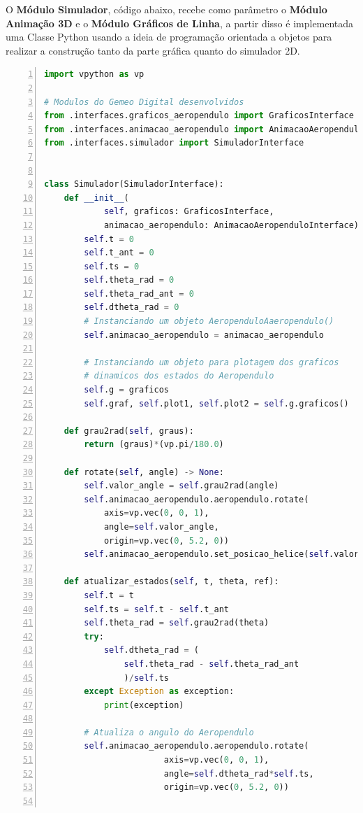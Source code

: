 \newpage

O \textbf{Módulo Simulador}, código abaixo, recebe como parâmetro  o \textbf{Módulo Animação 3D} e o \textbf{Módulo Gráficos de Linha}, a partir disso  é implementada uma Classe Python usando a ideia de programação orientada a objetos para realizar a construção tanto da parte gráfica quanto do simulador 2D.

\vspace{0.5cm}

\begin{lstlisting}[language=python, numbers=left, label=python-example, captionpos=b, caption={Classe que implementa o Gêmeo Digital}]
import vpython as vp

# Modulos do Gemeo Digital desenvolvidos
from .interfaces.graficos_aeropendulo import GraficosInterface
from .interfaces.animacao_aeropendulo import AnimacaoAeropenduloInterface
from .interfaces.simulador import SimuladorInterface


class Simulador(SimuladorInterface):
    def __init__(
            self, graficos: GraficosInterface,
            animacao_aeropendulo: AnimacaoAeropenduloInterface) -> None:
        self.t = 0
        self.t_ant = 0
        self.ts = 0
        self.theta_rad = 0
        self.theta_rad_ant = 0
        self.dtheta_rad = 0
        # Instanciando um objeto AeropenduloAaeropendulo()
        self.animacao_aeropendulo = animacao_aeropendulo

        # Instanciando um objeto para plotagem dos graficos
        # dinamicos dos estados do Aeropendulo
        self.g = graficos
        self.graf, self.plot1, self.plot2 = self.g.graficos()  # noqa

    def grau2rad(self, graus):
        return (graus)*(vp.pi/180.0)

    def rotate(self, angle) -> None:
        self.valor_angle = self.grau2rad(angle)
        self.animacao_aeropendulo.aeropendulo.rotate(
            axis=vp.vec(0, 0, 1),
            angle=self.valor_angle,
            origin=vp.vec(0, 5.2, 0))
        self.animacao_aeropendulo.set_posicao_helice(self.valor_angle)

    def atualizar_estados(self, t, theta, ref):
        self.t = t
        self.ts = self.t - self.t_ant
        self.theta_rad = self.grau2rad(theta)
        try:
            self.dtheta_rad = (
                self.theta_rad - self.theta_rad_ant
                )/self.ts
        except Exception as exception:
            print(exception)

        # Atualiza o angulo do Aeropendulo
        self.animacao_aeropendulo.aeropendulo.rotate(
                        axis=vp.vec(0, 0, 1),
                        angle=self.dtheta_rad*self.ts,
                        origin=vp.vec(0, 5.2, 0))


\end{lstlisting}
